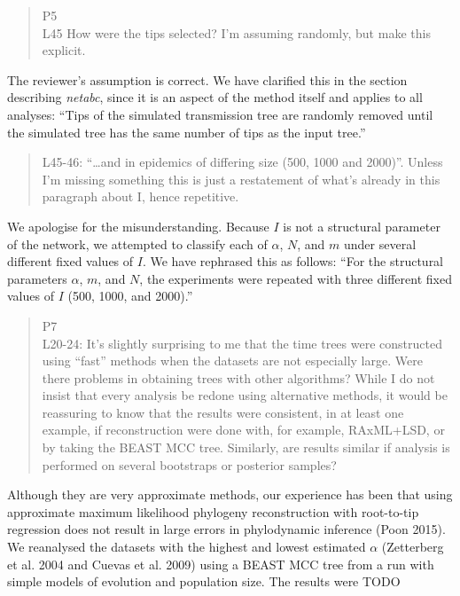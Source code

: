 \documentclass[12pt]{letter}
\begin{document}
\begin{letter}{ }
\begin{quote}
  \itshape

  P5 \\
  L45 How were the tips selected? I'm assuming randomly, but make this explicit.
\end{quote}

The reviewer's assumption is correct. We have clarified this in the section
describing \textit{netabc}, since it is an aspect of the method itself and
applies to all analyses: ``Tips of the simulated transmission tree are randomly
removed until the simulated tree has the same number of tips as the input
tree.''

\begin{quote}
  \itshape

  L45-46: “…and in epidemics of differing size (500, 1000 and 2000)”. Unless
  I’m missing something this is just a restatement of what’s already in this
  paragraph about I, hence repetitive. 
\end{quote}

We apologise for the misunderstanding. Because $I$ is not a structural
parameter of the network, we attempted to classify each of $\alpha$, $N$, and
$m$ under several different fixed values of $I$. We have rephrased this as
follows: ``For the structural parameters $\alpha$, $m$, and $N$, the
experiments were repeated with three different fixed values of $I$ (500, 1000,
and 2000).''

\begin{quote}
  \itshape

  P7 \\
  L20-24: It’s slightly surprising to me that the time trees were constructed
  using “fast” methods when the datasets are not especially large. Were there
  problems in obtaining trees with other algorithms? While I do not insist that
  every analysis be redone using alternative methods, it would be reassuring to
  know that the results were consistent, in at least one example, if
  reconstruction were done with, for example, RAxML+LSD, or by taking the BEAST
  MCC tree. Similarly, are results similar if analysis is performed on several
  bootstraps or posterior samples?
\end{quote}

Although they are very approximate methods, our experience has been that using
approximate maximum likelihood phylogeny reconstruction with root-to-tip
regression does not result in large errors in phylodynamic inference (Poon
2015). We reanalysed the datasets with the highest and lowest estimated
$\alpha$ (Zetterberg et al. 2004 and Cuevas et al. 2009) using a BEAST MCC tree
from a run with simple models of evolution and population size. The results
were TODO


\end{letter}
\end{document}
